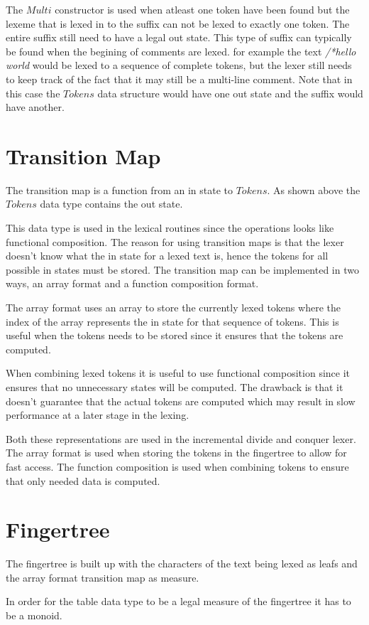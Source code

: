 The $Multi$ constructor is used when atleast one token have been found but the
lexeme that is lexed in to the suffix can not be lexed to exactly one token. The
entire suffix still need to have a legal out state. This type of suffix can
typically be found when the begining of comments are lexed. for example the text
\emph{/*hello world} would be lexed to a sequence of complete tokens, but the
lexer still needs to keep track of the fact that it may still be a multi-line
comment. Note that in this case the $Tokens$ data structure would have one out
state and the suffix would have another.

\section{Transition Map}
The transition map is a function from an in state to $Tokens$. As shown above
the $Tokens$ data type contains the out state.

This data type is used in the lexical routines since the operations looks like
functional composition. The reason for using transition maps is that the lexer
doesn't know what the in state for a lexed text is, hence the tokens for all
possible in states must be stored. The transition map can be implemented in two
ways, an array format and a function composition format.

The array format uses an array to store the currently lexed tokens where the
index of the array represents the in state for that sequence of tokens. This is
useful when the tokens needs to be stored since it ensures that the tokens are
computed.

When combining lexed tokens it is useful to use functional composition since it
ensures that no unnecessary states will be computed. The drawback is that it
doesn't guarantee that the actual tokens are computed which may result in slow
performance at a later stage in the lexing.

Both these representations are used in the incremental divide and conquer lexer.
The array format is used when storing the tokens in the fingertree to allow for
fast access. The function composition is used when combining tokens to ensure
that only needed data is computed.

\section{Fingertree}
The fingertree is built up with the characters of the text being lexed as leafs
and the array format transition map as measure.

In order for the table data type to be a legal measure of the fingertree it has
to be a monoid.
